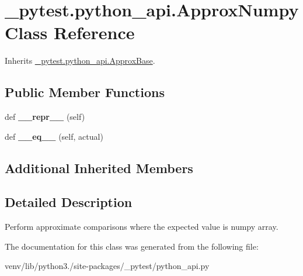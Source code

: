 \hypertarget{class__pytest_1_1python__api_1_1_approx_numpy}{}\section{\+\_\+pytest.\+python\+\_\+api.\+Approx\+Numpy Class Reference}
\label{class__pytest_1_1python__api_1_1_approx_numpy}


Inherits \hyperlink{class__pytest_1_1python__api_1_1_approx_base}{\+\_\+pytest.\+python\+\_\+api.\+Approx\+Base}.

\subsection*{Public Member Functions}
\begin{DoxyCompactItemize}
\item 
\mbox{\label{class__pytest_1_1python__api_1_1_approx_numpy_a3b4e3361320da46c20680abefaa8e45d}} 
def {\bfseries \+\_\+\+\_\+repr\+\_\+\+\_\+} (self)
\item 
\mbox{\label{class__pytest_1_1python__api_1_1_approx_numpy_a9f07bc75d0c356b6a1cb3ad5c8123507}} 
def {\bfseries \+\_\+\+\_\+eq\+\_\+\+\_\+} (self, actual)
\end{DoxyCompactItemize}
\subsection*{Additional Inherited Members}


\subsection{Detailed Description}
\begin{DoxyVerb}Perform approximate comparisons where the expected value is numpy array.
\end{DoxyVerb}
 

The documentation for this class was generated from the following file\+:\begin{DoxyCompactItemize}
\item 
venv/lib/python3./site-\/packages/\+\_\+pytest/python\+\_\+api.\+py\end{DoxyCompactItemize}
